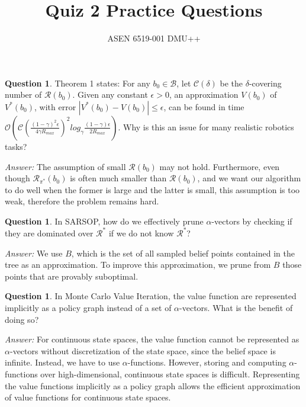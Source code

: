 \documentclass{article}
\title{Quiz 2 Practice Questions}
\author{ASEN 6519-001 DMU++}
\theoremstyle{definition}
\newtheorem{question}[thm]{Question}
\newenvironment{answer}{\noindent\textit{Answer:}}{}
\begin{document}
\maketitle

\begin{question}
Theorem 1 states: For any $b_0 \in \mathcal{B}$, let $\mathcal{C}(\delta)$ be the $\delta$-covering number of $\mathcal{R}(b_0)$. Given any constant $\epsilon > 0$, an approximation $V(b_0)$ of $V^*(b_0)$, with error $|V^*(b_0) - V(b_0)| \leq \epsilon$, can be found in time $\mathcal{O}\left( \mathcal{C} \left( \frac{(1-\gamma)^2\epsilon}{4\gamma R_{max}}\right)^2 log_{\gamma}\frac{(1-\gamma)\epsilon}{2R_{max}}\right)$. Why is this an issue for many realistic robotics tasks?
\end{question}
\begin{answer}
The assumption of small $\mathcal{R}(b_0)$ may not hold. Furthermore, even though $\mathcal{R}_{\pi^*}(b_0)$ is often much smaller than $\mathcal{R}(b_0)$, and we want our algorithm to do well when the former is large and the latter is small, this assumption is too weak, therefore the problem remains hard.
\end{answer}
\\
\par
\begin{question}
In SARSOP, how do we effectively prune $\alpha$-vectors by checking if they are dominated over $\mathcal{R}^*$ if we do not know $\mathcal{R}^*$?
\end{question}
\begin{answer}
We use $B$, which is the set of all sampled belief points contained in the tree as an approximation. To improve this approximation, we prune from $B$ those points that are provably suboptimal.
\end{answer}

\begin{question}
In Monte Carlo Value Iteration, the value function are represented implicitly as a policy graph instead of a set of $\alpha$-vectors. What is the benefit of doing so?
\end{question}

\begin{answer}
For continuous state spaces, the value function cannot be represented as $\alpha$-vectors without discretization of the state space, since the belief space is infinite. Instead, we have to use $\alpha$-functions. However, storing and computing $\alpha$-functions over high-dimensional, continuous state spaces is difficult. Representing the value functions implicitly as a policy graph allows the efficient approximation of value functions for continuous state spaces.
\end{answer}
\end{document}
